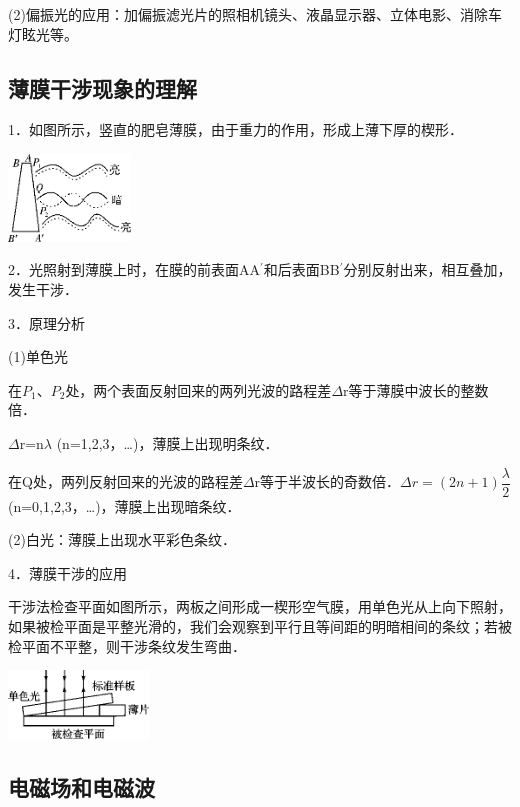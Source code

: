(2)偏振光的应用：加偏振滤光片的照相机镜头、液晶显示器、立体电影、消除车灯眩光等。

\newpage
\subsection{薄膜干涉现象的理解}

1．如图所示，竖直的肥皂薄膜，由于重力的作用，形成上薄下厚的楔形．

\begin{center}\includegraphics[width=1.28333in,height=0.91528in]{media/image560.png}\end{center}

2．光照射到薄膜上时，在膜的前表面AA$^\prime$和后表面BB$^\prime$分别反射出来，相互叠加，发生干涉．

3．原理分析

(1)单色光

在$P_1$、$P_2$处，两个表面反射回来的两列光波的路程差$\Delta$r等于薄膜中波长的整数倍．

$\Delta$r=n$\lambda$ (n=1,2,3，\ldots)，薄膜上出现明条纹．

在Q处，两列反射回来的光波的路程差$\Delta$r等于半波长的奇数倍．$\Delta r=(2n+1)\dfrac{\lambda}{2}$
(n=0,1,2,3，\ldots)，薄膜上出现暗条纹．

(2)白光：薄膜上出现水平彩色条纹．

4．薄膜干涉的应用

干涉法检查平面如图所示，两板之间形成一楔形空气膜，用单色光从上向下照射，如果被检平面是平整光滑的，我们会观察到平行且等间距的明暗相间的条纹；若被检平面不平整，则干涉条纹发生弯曲．

\begin{center}\includegraphics[width=1.47153in,height=0.71667in]{media/image561.png}\end{center}

\newpage
\subsection{电磁场和电磁波}

